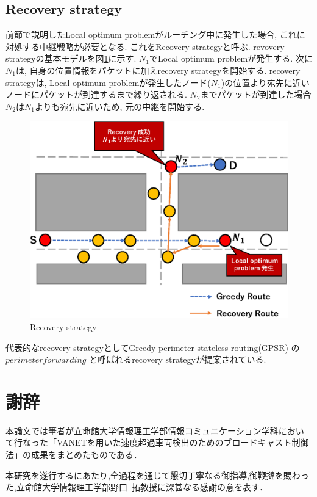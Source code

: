 \documentclass[10pt]{jreport}
\begin{document}
\section{Recovery strategy}
前節で説明したLocal optimum problemがルーチング中に発生した場合, これに対処する中継戦略が必要となる. これをRecovery strategy\cite{28}と呼ぶ. revovery strategyの基本モデルを図\ref{fig:Recovery}に示す. $N_{1}$でLocal optimum problemが発生する. 次に$N_{1}$は, 自身の位置情報をパケットに加えrecovery strategyを開始する. recovery strategyは, Local optimum problemが発生したノード($N_{1}$)の位置より宛先に近いノードにパケットが到達するまで繰り返される. $N_{2}$までパケットが到達した場合$N_{2}$は$N_{1}$よりも宛先に近いため, 元の中継を開始する. 
  

\begin{figure}[!ht]
	\centering
	\includegraphics[width=130mm]{figures/basic-recovery.eps}
	\caption{Recovery strategy}
	\label{fig:Recovery}
\end{figure}

代表的なrecovery strategyとしてGreedy perimeter stateless routing(GPSR) \cite{6}の $perimeter forwarding$
と呼ばれるrecovery strategyが提案されている. 

\chapter*{謝辞}
\sloppy
本論文では筆者が立命館大学情報理工学部情報コミュニケーション学科におい
て行なった「VANETを用いた速度超過車両検出のためのブロードキャスト制御法」の成果をまとめたものである．

本研究を遂行するにあたり,全過程を通じて懇切丁寧なる御指導,御鞭撻を賜わっ
た,立命館大学情報理工学部野口~拓教授に深甚なる感謝の意を表す．
\end{document}
